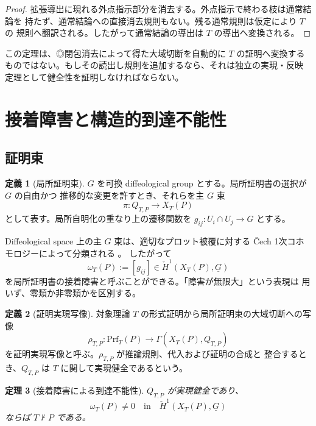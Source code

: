 \documentclass[a4paper,11pt]{ltjsarticle}
\theoremstyle{definition}
\newtheorem{definition}{定義}[section]
\theoremstyle{plain}
\newtheorem{theorem}[definition]{定理}
\newcommand{\Prf}{\mathrm{Prf}}
\newcommand{\1}{\mathbf{1}}
\begin{document}
\begin{proof}
拡張導出に現れる外点指示部分を消去する。外点指示で終わる枝は通常結論を
持たず、通常結論への直接消去規則もない。残る通常規則は仮定により $T$ の
規則へ翻訳される。したがって通常結論の導出は $T$ の導出へ変換される。
\end{proof}

この定理は、◎閉包消去によって得た大域切断を自動的に $T$ の証明へ変換する
ものではない。もしその読出し規則を追加するなら、それは独立の実現・反映
定理として健全性を証明しなければならない。

\section{接着障害と構造的到達不能性}

\subsection{証明束}

\begin{definition}[局所証明束]
$G$ を可換 diffeological group とする。局所証明書の選択が $G$ の自由かつ
推移的な変更を許すとき、それらを主 $G$ 束
\[
 \pi:Q_{T,P}\longrightarrow X_T(P)
\]
として表す。局所自明化の重なり上の遷移関数を $g_{ij}:U_i\cap U_j\to G$
とする。
\end{definition}

Diffeological space 上の主 $G$ 束は、適切なプロット被覆に対する Čech
1次コホモロジーによって分類される \cite{KrepskiWattsWolbert2022}。
したがって
\[
 \omega_T(P):=[g_{ij}]
 \in\check H^1(X_T(P),\underline G)
\]
を局所証明書の接着障害と呼ぶことができる。「障害が無限大」という表現は
用いず、零類か非零類かを区別する。

\begin{definition}[証明実現写像]
対象理論 $T$ の形式証明から局所証明束の大域切断への写像
\begin{equation}\label{eq:realization}
 \rho_{T,P}:\Prf_T(P)\longrightarrow
 \Gamma(X_T(P),Q_{T,P})
\end{equation}
を証明実現写像と呼ぶ。$\rho_{T,P}$ が推論規則、代入および証明の合成と
整合するとき、$Q_{T,P}$ は $T$ に関して実現健全であるという。
\end{definition}

\begin{theorem}[接着障害による到達不能性]\label{thm:obstruction}
$Q_{T,P}$ が実現健全であり、
\[
 \omega_T(P)\ne0
 \quad\text{in}\quad
 \check H^1(X_T(P),\underline G)
\]
ならば $T\nvdash P$ である。
\end{theorem}
\end{document}
